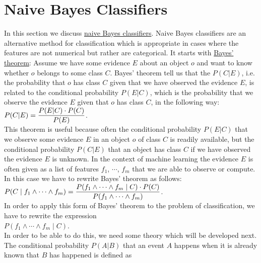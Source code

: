 \section{Naive Bayes Classifiers}
In this section we discuss \href{https://en.wikipedia.org/wiki/Naive_Bayes_classifier}{naive Bayes classifiers}.
Naive Bayes classifiers are an alternative method for classification which is appropriate in cases where the
features are not numerical but rather are categorical.  It starts with \href{https://en.wikipedia.org/wiki/Bayes%27_theorem}{Bayes' theorem}:
Assume we have some evidence $E$ about an object $o$ and want to know whether $o$ belongs to some class $C$.
Bayes' theorem tell us that the  $P(C|E)$, i.e. the probability that $o$ has class $C$
given that we have observed the evidence $E$, is related to the conditional probability $P(E|C)$, which is the probability that we
observe the evidence $E$ given that $o$ has class $C$, in the following way:
\\[0.2cm]
\hspace*{1.3cm}
$\displaystyle P(C|E) = \frac{P(E|C) \cdot P(C)}{P(E)}$.
\\[0.2cm]
This theorem is useful because often the conditional probability $P(E|C)$ that we observe some evidence $E$ in an object
$o$ of class $C$ is readily available, but the conditional probability $P(C|E)$ that an object has class $C$ if
we have observed the evidence $E$ is unknown.  In the context of machine learning the evidence $E$ is often
given as a list of features $f_1$, $\cdots$, $f_m$ that we are able to observe or compute.  In this case we
have to rewrite Bayes' theorem as follows:
\\[0.2cm]
\hspace*{1.3cm}
$\displaystyle P(C\;|\;f_1 \wedge \cdots \wedge f_m) = \frac{P(f_1 \wedge \cdots \wedge f_m\;|\;C) \cdot P(C)}{P(f_1 \wedge \cdots \wedge f_m)}$.
\\[0.2cm]
In order to apply this form of Bayes' theorem to the problem of classification, we have to rewrite the expression
\\[0.2cm]
\hspace*{1.3cm}
$P(f_1 \wedge \cdots \wedge f_m\;|\;C)$.
\\[0.2cm]
In order to be able to do this, we need some theory which will be developed next.  The conditional probability
$P(A|B)$ that an event $A$ happens when it is already known that $B$ has happened is defined as 
\\[0.2cm]
\hspace*{1.3cm}
